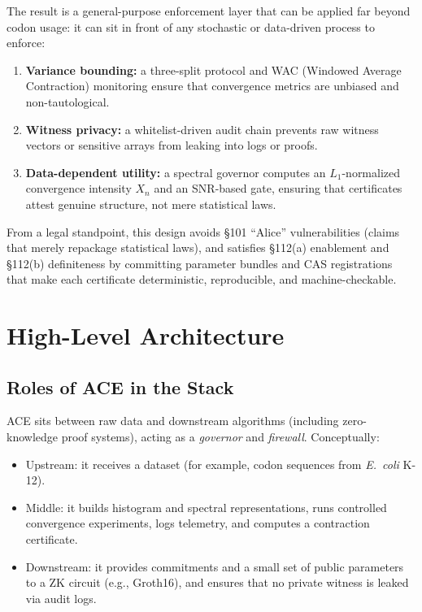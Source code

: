 \documentclass[11pt]{article}
\begin{document}
The result is a general-purpose enforcement layer that can be applied far beyond codon usage:
it can sit in front of any stochastic or data-driven process to enforce:

\begin{enumerate}[nosep]
  \item \textbf{Variance bounding:} a three-split protocol and WAC (Windowed Average Contraction) monitoring ensure that convergence metrics are unbiased and non-tautological.
  \item \textbf{Witness privacy:} a whitelist-driven audit chain prevents raw witness vectors or sensitive arrays from leaking into logs or proofs.
  \item \textbf{Data-dependent utility:} a spectral governor computes an $L_1$-normalized convergence intensity $X_n$ and an SNR-based gate, ensuring that certificates attest genuine structure, not mere statistical laws.
\end{enumerate}

From a legal standpoint, this design avoids §101 ``Alice'' vulnerabilities (claims that merely repackage statistical laws), and satisfies §112(a) enablement and §112(b) definiteness by committing parameter bundles and CAS registrations that make each certificate deterministic, reproducible, and machine-checkable.

\section{High-Level Architecture}

\subsection{Roles of ACE in the Stack}

ACE sits between raw data and downstream algorithms (including zero-knowledge proof systems), acting as a \emph{governor} and \emph{firewall}. Conceptually:

\begin{itemize}[nosep]
  \item Upstream: it receives a dataset (for example, codon sequences from \emph{E.~coli} K-12).
  \item Middle: it builds histogram and spectral representations, runs controlled convergence experiments, logs telemetry, and computes a contraction certificate.
  \item Downstream: it provides commitments and a small set of public parameters to a ZK circuit (e.g., Groth16), and ensures that no private witness is leaked via audit logs.
\end{itemize}
\end{document}
